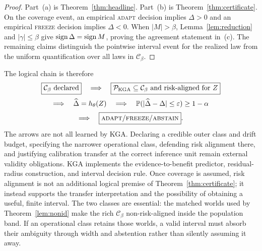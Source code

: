 \begin{proof}
Part~(a) is Theorem~\ref{thm:headline}.  Part~(b) is
Theorem~\ref{thm:certificate}.  On the coverage event, an empirical
\textsc{adapt} decision implies $\Delta>0$ and an empirical \textsc{freeze}
decision implies $\Delta<0$.  When $|M|>\beta$,
Lemma~\ref{lem:reduction} and $|\gamma|\le\beta$ give
$\sign\Delta=\sign M$, proving the agreement statement in~(c).  The remaining
claims distinguish the pointwise interval event for the realized law from the
uniform quantification over all laws in $\mathcal C_\beta$.
\end{proof}

The logical chain is therefore
\[
\begin{gathered}
  \boxed{\mathcal C_\beta\ \text{declared}}
  \quad\Longrightarrow\quad
  \boxed{\mathcal P_{\mathrm{KGA}}\subseteq\mathcal C_\beta
         \text{ and risk-aligned for }Z}\\[2pt]
  \Longrightarrow\quad \widehat\Delta=h_\theta(Z)
  \quad\Longrightarrow\quad
  \Pr(|\widehat\Delta-\Delta|\le\varepsilon)\ge1-\alpha\\[2pt]
  \Longrightarrow\quad
  \boxed{\textsc{adapt}/\textsc{freeze}/\textsc{abstain}}.
\end{gathered}
\]
The arrows are not all learned by KGA.  Declaring a credible outer class and
drift budget, specifying the narrower operational class, defending risk
alignment there, and justifying calibration transfer at the correct inference
unit remain external validity obligations.  KGA implements the
evidence-to-benefit predictor, residual-radius construction, and interval
decision rule.  Once coverage is assumed, risk alignment is not an additional
logical premise of Theorem~\ref{thm:certificate}; it instead supports the
transfer interpretation and the possibility of obtaining a useful, finite
interval.  The two classes are essential: the matched worlds used by
Theorem~\ref{lem:nonid} make the rich $\mathcal C_\beta$ non-risk-aligned inside
the population band.  If an operational class retains those worlds, a valid
interval must absorb their ambiguity through width and abstention rather than
silently assuming it away.

